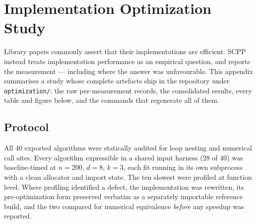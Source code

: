 %
%
%
%

\section{Implementation Optimization Study}
\label{app:optimization}

Library papers commonly assert that their implementations are efficient.
SCPP instead treats implementation performance as an empirical question,
and reports the measurement --- including where the answer was
unfavourable. This appendix summarises a study whose complete artefacts
ship in the repository under \texttt{optimization/}: the raw
per-measurement records, the consolidated results, every table and
figure below, and the commands that regenerate all of them.

\subsection{Protocol}
\label{app:opt:protocol}

All 40 exported algorithms were statically audited for loop nesting and
numerical call sites. Every algorithm expressible in a shared input
harness (28 of 40) was baseline-timed at $n = 200$, $d = 8$, $k = 3$,
each fit running in its own subprocess with a clean allocator and import
state. The ten slowest were profiled at function level. Where profiling
identified a defect, the implementation was rewritten, its
pre-optimization form preserved verbatim as a separately importable
reference build, and the two compared for numerical equivalence
\emph{before} any speedup was reported.

